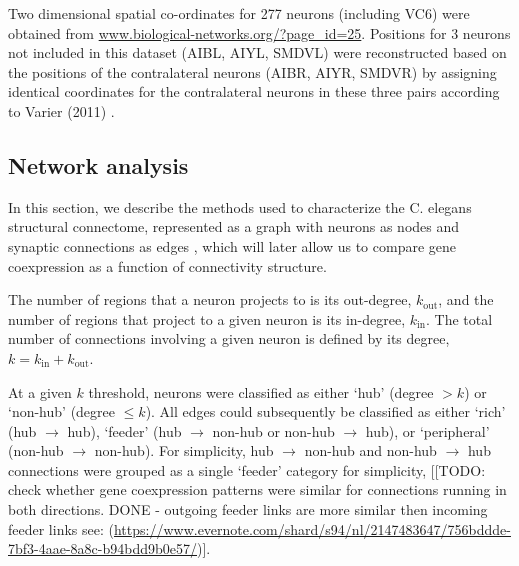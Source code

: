 \documentclass[10pt,letterpaper]{article}
\begin{document}
Two dimensional spatial co-ordinates for 277 neurons (including VC6) were obtained from \url{www.biological-networks.org/?page_id=25}.
Positions for 3 neurons not included in this dataset (AIBL, AIYL, SMDVL) were reconstructed based on the positions of the contralateral neurons (AIBR, AIYR, SMDVR) by assigning identical coordinates for the contralateral neurons in these three pairs according to Varier (2011) \cite{Varier2011}.


\subsection*{Network analysis}

In this section, we describe the methods used to characterize the C. elegans structural connectome, represented as a graph with neurons as nodes and synaptic connections as edges \cite{Schroter:2017eo}, which will later allow us to compare gene coexpression as a function of connectivity structure.

The number of regions that a neuron projects to is its out-degree, $k_\mathrm{out}$, and the number of regions that project to a given neuron is its in-degree, $k_\mathrm{in}$.
The total number of connections involving a given neuron is defined by its degree, $k = k_\mathrm{in} + k_\mathrm{out}$.

At a given $k$ threshold, neurons were classified as either `hub' (degree $>k$) or `non-hub' (degree $\leq k$).
All edges could subsequently be classified as either `rich' (hub $\rightarrow$ hub), `feeder' (hub $\rightarrow$ non-hub or non-hub $\rightarrow$ hub), or `peripheral' (non-hub $\rightarrow$ non-hub).
For simplicity, hub $\rightarrow$ non-hub and non-hub $\rightarrow$ hub connections were grouped as a single `feeder' category for simplicity, [[TODO: check whether gene coexpression patterns were similar for connections running in both directions. DONE - outgoing feeder links are more similar then incoming feeder links see: (\url{https://www.evernote.com/shard/s94/nl/2147483647/756bddde-7bf3-4aae-8a8c-b94bdd9b0e57/})].
\end{document}
